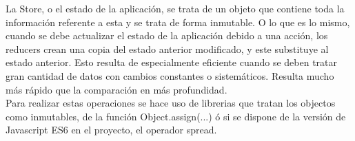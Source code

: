 La Store, o el estado de la aplicación, se trata de un objeto que contiene toda la información referente a esta y se trata de forma inmutable. O lo que es lo mismo, cuando se debe actualizar el estado de la aplicación debido a una acción, los reducers crean una copia del estado anterior modificado, y este substituye al estado anterior. Esto resulta de especialmente eficiente cuando se deben tratar gran cantidad de datos con cambios constantes o sistemáticos. Resulta mucho más rápido que la comparación en más profundidad. \\

Para realizar estas operaciones se hace uso de librerias que tratan los objectos como inmutables, de la función Object.assign(...) ó si se dispone de la versión de Javascript ES6 en el proyecto, el operador spread. \\


